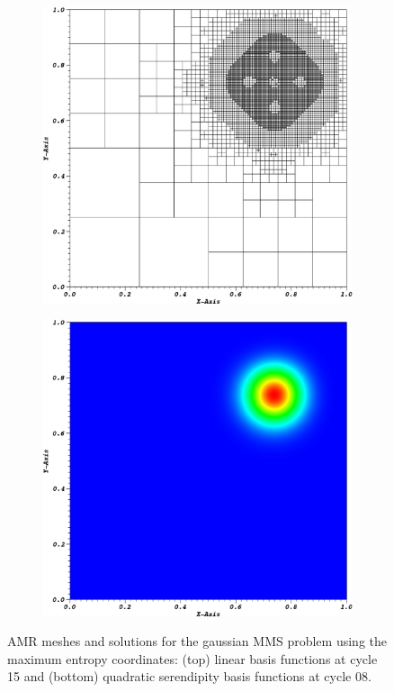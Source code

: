 \begin{figure}
{\begin{subfigure}[b]{0.485\textwidth}
	\end{subfigure}
}
\vspace{1cm}
{
	\begin{subfigure}[b]{0.485\textwidth}
		\centering
		\label{subfig::AMR_GQ_ME2_mesh}
		\includegraphics[width=\textwidth]{figures/sec_BF/ME2_cart_Irr=1_cyc08_mesh.eps}
	\end{subfigure}
	\hfill
	\begin{subfigure}[b]{0.485\textwidth}
		\centering
		\label{subfig::AMR_GQ_ME2_sol}
		\includegraphics[width=\textwidth]{figures/sec_BF/ME2_cart_Irr=1_cyc08_sol.eps}
	\end{subfigure}
}
\caption{AMR meshes and solutions for the gaussian MMS problem using the maximum entropy coordinates: (top) linear basis functions at cycle 15 and (bottom) quadratic serendipity basis functions at cycle 08.}
\label{fig::BF_Results_MMS_GQ_AMR_MeshSol}
\end{figure}

